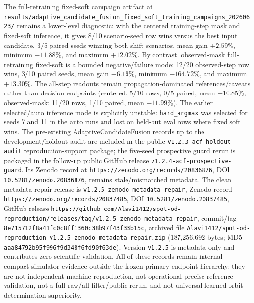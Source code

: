 \documentclass{article}
\begin{document}
The full-retraining fixed-soft campaign artifact at \nolinkurl{results/adaptive_candidate_fusion_fixed_soft_training_campaigns_20260623/} remains a lower-level diagnostic: with the centered training-step mask and fixed-soft inference, it gives 8/10 scenario-seed row wins versus the best input candidate, 3/5 paired seeds winning both shift scenarios, mean gain \(+2.59\)\%, minimum \(-11.88\)\%, and maximum \(+12.02\)\%. By contrast, observed-mask full-retraining fixed-soft is a bounded negative/failure mode: 12/20 observed-step row wins, 3/10 paired seeds, mean gain \(-6.19\)\%, minimum \(-164.72\)\%, and maximum \(+13.30\)\%. The all-step readouts remain propagation-dominated references/caveats rather than decision endpoints (centered: 5/10 rows, 0/5 paired, mean \(-10.85\)\%; observed-mask: 11/20 rows, 1/10 paired, mean \(-11.99\)\%). The earlier selected/auto inference mode is explicitly unstable: \texttt{hard\_argmax} was selected for seeds 7 and 11 in the auto runs and lost on held-out eval rows where fixed soft wins. The pre-existing AdaptiveCandidateFusion records up to the development/holdout audit are included in the public \texttt{v1.2.3-acf-holdout-audit} reproduction-support package; the five-seed prospective guard rerun is packaged in the follow-up public GitHub release \texttt{v1.2.4-acf-prospective-guard}. Its Zenodo record at \nolinkurl{https://zenodo.org/records/20836876}, DOI \nolinkurl{10.5281/zenodo.20836876}, remains stale/mismatched metadata. The clean metadata-repair release is \texttt{v1.2.5-zenodo-metadata-repair}, Zenodo record \nolinkurl{https://zenodo.org/records/20837485}, DOI \nolinkurl{10.5281/zenodo.20837485}, GitHub release \nolinkurl{https://github.com/Alavi1412/spot-od-reproduction/releases/tag/v1.2.5-zenodo-metadata-repair}, commit/tag \texttt{8e715712f8a41fc0c8ff1360c38b97f43f33b15c}, archived file \texttt{Alavi1412/spot-od-reproduction-v1.2.5-zenodo-metadata-repair.zip} (187,256,692 bytes; MD5 \texttt{aaa84792b95f996f9d348f6fd90f63de}). Version \texttt{v1.2.5} is metadata-only and contributes zero scientific validation. All of these records remain internal compact-simulator evidence outside the frozen primary endpoint hierarchy; they are not independent-machine reproduction, not operational precise-reference validation, not a full raw/all-filter/public rerun, and not universal learned orbit-determination superiority.
\end{document}
